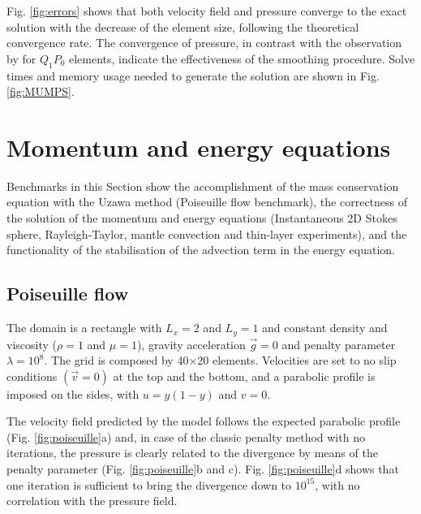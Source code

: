 \documentclass[draft,tec]{agutexSI2019}
\begin{document}
\begin{article}
Fig. \ref{fig:errors} shows that both velocity field and pressure converge to the exact solution with the decrease of the element size, following the theoretical convergence rate. The convergence of pressure, in contrast with the observation by  for $Q_1P_0$ elements, indicate the effectiveness of the smoothing procedure. Solve times and memory usage needed to generate the solution are shown in Fig. \ref{fig:MUMPS}.

\section{Momentum and energy equations}\label{sec:momentum}
Benchmarks in this Section show the accomplishment of the mass conservation equation with the Uzawa method (Poiseuille flow benchmark), the correctness of the solution of the momentum and energy equations (Instantaneous 2D Stokes sphere, Rayleigh-Taylor, mantle convection and thin-layer experiments), and the functionality of the stabilisation of the advection term in the energy equation.

\subsection{Poiseuille flow}\label{sec:poiseuille}
The domain is a rectangle with $L_x=2$ and $L_y=1$ and constant density and viscosity ($\rho=1$ and $\mu=1$), gravity acceleration $\vec{g}=0$ and penalty parameter $\lambda=10^8$. The grid is composed by 40×20 elements. Velocities are set to no slip conditions $(\vec{v}=0)$ at the top and the bottom, and a parabolic profile is imposed on the sides, with $u=y(1-y)$ and $v=0$.

The velocity field predicted by the model follows the expected parabolic profile (Fig. \ref{fig:poiseuille}a) and, in case of the classic penalty method with no iterations, the pressure is clearly related to the divergence by means of the penalty parameter (Fig. \ref{fig:poiseuille}b and c). Fig. \ref{fig:poiseuille}d shows that one iteration is sufficient to bring the divergence down to $10^{15}$, with no correlation with the pressure field.


\end{article}
\end{document}
